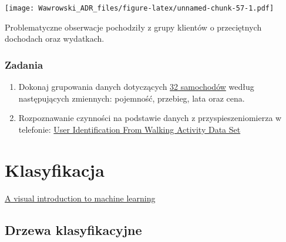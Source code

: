 \documentclass[]{book}
\newenvironment{Shaded}{\begin{snugshade}}{\end{snugshade}}
\newcommand{\DataTypeTok}[1]{\textcolor[rgb]{0.13,0.29,0.53}{#1}}
\newcommand{\KeywordTok}[1]{\textcolor[rgb]{0.13,0.29,0.53}{\textbf{#1}}}
\newcommand{\NormalTok}[1]{#1}
\newcommand{\OperatorTok}[1]{\textcolor[rgb]{0.81,0.36,0.00}{\textbf{#1}}}
\newcommand{\StringTok}[1]{\textcolor[rgb]{0.31,0.60,0.02}{#1}}
\begin{document}
\begin{Shaded}
\end{Shaded}

\texttt{[image: Wawrowski\_ADR\_files/figure-latex/unnamed-chunk-57-1.pdf]}

Problematyczne obserwacje pochodziły z grupy klientów o przeciętnych dochodach oraz wydatkach.

\hypertarget{zadania}{%
\subsection{Zadania}\label{zadania}}

\begin{enumerate}
\def\labelenumi{\arabic{enumi}.}
\item
  Dokonaj grupowania danych dotyczących \href{data/auta.csv}{32 samochodów} według następujących zmiennych: pojemność, przebieg, lata oraz cena.
\item
  Rozpoznawanie czynności na podstawie danych z przyspieszeniomierza w telefonie: \href{http://archive.ics.uci.edu/ml/datasets/User+Identification+From+Walking+Activity\#}{User Identification From Walking Activity Data Set}
\end{enumerate}

\hypertarget{klasyfikacja}{%
\chapter{Klasyfikacja}\label{klasyfikacja}}

\href{http://www.r2d3.us/visual-intro-to-machine-learning-part-1/}{A visual introduction to machine learning}

\hypertarget{drzewa-klasyfikacyjne}{%
\section{Drzewa klasyfikacyjne}\label{drzewa-klasyfikacyjne}}
\end{document}
